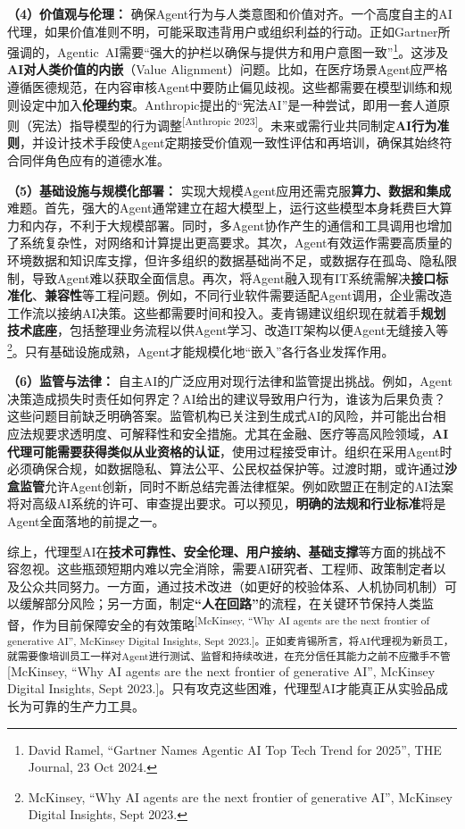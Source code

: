 \documentclass[
  letterpaper,
]{scrbook}
\begin{document}
\textbf{（4）价值观与伦理：}
确保Agent行为与人类意图和价值对齐。一个高度自主的AI代理，如果价值准则不明，可能采取违背用户或组织利益的行动。正如Gartner所强调的，Agentic~AI需要``强大的护栏以确保与提供方和用户意图一致''\footnote{David
  Ramel, ``Gartner Names Agentic AI Top Tech Trend for 2025'', THE
  Journal, 23 Oct 2024.}。这涉及\textbf{AI对人类价值的内嵌}（Value
Alignment）问题。比如，在医疗场景Agent应严格遵循医德规范，在内容审核Agent中要防止偏见歧视。这些都需要在模型训练和规则设定中加入\textbf{伦理约束}。Anthropic提出的``宪法AI''是一种尝试，即用一套人道原则（宪法）指导模型的行为调整\textsuperscript{{[}Anthropic
2023{]}}。未来或需行业共同制定\textbf{AI行为准则}，并设计技术手段使Agent定期接受价值观一致性评估和再培训，确保其始终符合同伴角色应有的道德水准。

\textbf{（5）基础设施与规模化部署：}
实现大规模Agent应用还需克服\textbf{算力、数据和集成}难题。首先，强大的Agent通常建立在超大模型上，运行这些模型本身耗费巨大算力和内存，不利于大规模部署。同时，多Agent协作产生的通信和工具调用也增加了系统复杂性，对网络和计算提出更高要求。其次，Agent有效运作需要高质量的环境数据和知识库支撑，但许多组织的数据基础尚不足，或数据存在孤岛、隐私限制，导致Agent难以获取全面信息。再次，将Agent融入现有IT系统需解决\textbf{接口标准化}、\textbf{兼容性}等工程问题。例如，不同行业软件需要适配Agent调用，企业需改造工作流以接纳AI决策。这些都需要时间和投入。麦肯锡建议组织现在就着手\textbf{规划技术底座}，包括整理业务流程以供Agent学习、改造IT架构以便Agent无缝接入等\footnote{McKinsey,
  ``Why AI agents are the next frontier of generative AI'', McKinsey
  Digital Insights, Sept 2023.}。只有基础设施成熟，Agent才能规模化地``嵌入''各行各业发挥作用。

\textbf{（6）监管与法律：}
自主AI的广泛应用对现行法律和监管提出挑战。例如，Agent决策造成损失时责任如何界定？AI给出的建议导致用户行为，谁该为后果负责？这些问题目前缺乏明确答案。监管机构已关注到生成式AI的风险，并可能出台相应法规要求透明度、可解释性和安全措施。尤其在金融、医疗等高风险领域，\textbf{AI代理可能需要获得类似从业资格的认证}，使用过程接受审计。组织在采用Agent时必须确保合规，如数据隐私、算法公平、公民权益保护等。过渡时期，或许通过\textbf{沙盒监管}允许Agent创新，同时不断总结完善法律框架。例如欧盟正在制定的AI法案将对高级AI系统的许可、审查提出要求。可以预见，\textbf{明确的法规和行业标准}将是Agent全面落地的前提之一。

综上，代理型AI在\textbf{技术可靠性、安全伦理、用户接纳、基础支撑}等方面的挑战不容忽视。这些瓶颈短期内难以完全消除，需要AI研究者、工程师、政策制定者以及公众共同努力。一方面，通过技术改进（如更好的校验体系、人机协同机制）可以缓解部分风险；另一方面，制定\textbf{``人在回路''}的流程，在关键环节保持人类监督，作为目前保障安全的有效策略\textsuperscript{{[}McKinsey,
``Why AI agents are the next frontier of generative AI'', McKinsey
Digital Insights, Sept
2023.{]}。正如麦肯锡所言，将AI代理视为新员工，就需要像培训员工一样对Agent进行测试、监督和持续改进，在充分信任其能力之前不应撒手不管}{[}McKinsey,
``Why AI agents are the next frontier of generative AI'', McKinsey
Digital Insights, Sept
2023.{]}。只有攻克这些困难，代理型AI才能真正从实验品成长为可靠的生产力工具。
\end{document}
